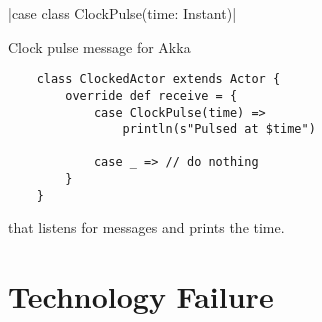 \begin{listing}
    |case class ClockPulse(time: Instant)|
    \caption{Clock pulse message for Akka}
    \label{lst:procsim-scala:clock-pulse}
\end{listing}

\begin{listing}
    \begin{verbatim}
    class ClockedActor extends Actor {
        override def receive = {
            case ClockPulse(time) => 
                println(s"Pulsed at $time")
            
            case _ => // do nothing
        }
    }
    \end{verbatim}
    \caption{\akkaActor{} that listens for  messages and prints the time.}
    \label{lst:procsim-scala:clock-pulse-actor}
\end{listing}


\section{Technology Failure}

